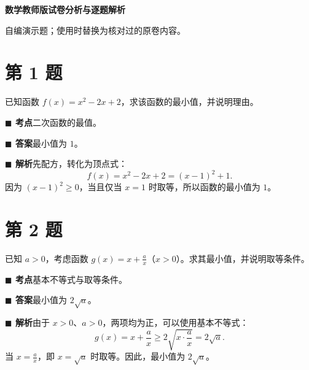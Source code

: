 \documentclass[11pt,a4paper]{ctexart}
\newcommand{\qlabel}[1]{\par\medskip\nopagebreak\textbf{\textcolor{subjectgreen}{\ensuremath{\blacksquare} #1}}\quad}
\begin{document}
\noindent\colorbox{subjectgreen}{\parbox{\dimexpr\linewidth-2\fboxsep\relax}{\vspace{5pt}\hspace{8pt}\color{white}\Large\bfseries 数学教师版\quad\normalsize 试卷分析与逐题解析\vspace{5pt}}}

自编演示题；使用时替换为核对过的原卷内容。

\section*{第 1 题}
已知函数 $f(x)=x^2-2x+2$，求该函数的最小值，并说明理由。

\qlabel{考点}二次函数的最值。

\qlabel{答案}最小值为 $1$。

\qlabel{解析}先配方，转化为顶点式：
\[
f(x)=x^2-2x+2=(x-1)^2+1.
\]
因为 $(x-1)^2\geq 0$，当且仅当 $x=1$ 时取等，所以函数的最小值为 $1$。

\section*{第 2 题}
已知 $a>0$，考虑函数 $g(x)=x+\frac{a}{x}$（$x>0$）。求其最小值，并说明取等条件。

\qlabel{考点}基本不等式与取等条件。

\qlabel{答案}最小值为 $2\sqrt a$。

\qlabel{解析}由于 $x>0$、$a>0$，两项均为正，可以使用基本不等式：
\[
g(x)=x+\frac{a}{x}\geq 2\sqrt{x\cdot\frac{a}{x}}=2\sqrt a.
\]
当 $x=\frac{a}{x}$，即 $x=\sqrt a$ 时取等。因此，最小值为 $2\sqrt a$。
\end{document}
